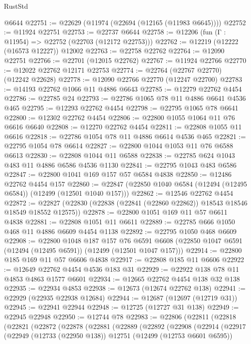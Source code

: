 \begin{lexlean}{RustStd}
\begin{coremodule}
    @6644
@22751 := @22629 (@11974 (@22694 (@12165 (@11983 @6645))))
@22752 := @11924 @22751
@22753 := @22737 @6644
@22758 := @12206 (fun (Γ : @11954) => @22752 (@22703 (@12172 @22753)))
@22762 := @12219 (@12222 (@16573 @12227)) @12002
@22763 := @22758 @22762
@22764 := @12090 @22751
@22766 := @22701 (@12015 @22762)
@22767 := @11924 @22766
@22770 := @12022 @22762 @12171 @22753
@22774 := @22764 (@22767 @22770) (@12242 @22628)
@22778 := @12090 @22766 @22770 (@12247 @22700)
@22783 := @14193 @22762 @1066 @11 @4886 @6643
@22785 := @12279 @22762 @4454
@22786 := @22785 @24
@22793 := @22786 @1065 @78 @11 @4886 @6641 @4536 @465
@22795 := @12293 @22762 @4454
@22798 := @22795 @1065 @78 @6641
@22800 := @12302 @22762 @4454
@22806 := @22800 @1055 @1064 @11 @76 @6616 @6640
@22808 := @12270 @22762 @4454
@22811 := @22808 @1055 @11 @6616
@22818 := @22786 @1054 @78 @11 @4886 @6614 @4536 @465
@22821 := @22795 @1054 @78 @6614
@22827 := @22800 @1044 @1053 @11 @76 @6588 @6613
@22830 := @22808 @1044 @11 @6588
@22838 := @22785 @624 @1043 @483 @11 @4886 @6586 @4536 @1130
@22841 := @22795 @1043 @483 @6586
@22847 := @22800 @1041 @169 @157 @57 @6584 @4838
@22850 := @12486 @22762 @4454 @157
@22860 := @22847 (@22850 @1040 @6584 (@12494 (@12495 @6584)) (@12499 (@12501 @1040 @157)))
@22862 := @12546 @22762 @4454
@22872 := @22827 (@22830 (@22838 (@22841 (@22860 @22862)) @18543 @18546 @18549 @18552 @12575))
@22878 := @22800 @1051 @169 @11 @57 @6611 @4838
@22881 := @22808 @1051 @11 @6611
@22889 := @22785 @666 @1050 @468 @11 @4886 @6609 @4454 @1138
@22892 := @22795 @1050 @468 @6609
@22908 := @22800
    @1048
    @187
    @157
    @76
    @6591
    @6608
    (@22850 @1047 @6591 (@12494 (@12495 @6591)) (@12499 (@12501 @1047 @157)))
@22914 := @22800 @185 @169 @11 @57 @6606 @4838
@22917 := @22808 @185 @11 @6606
@22922 := @12649 @22762 @4454 @4536 @183 @31
@22929 := @22922 @138 @78 @11 @4853 @4863 @1577 @6601
@22934 := @12665 @22762 @4454 @138 @32 @138
@22935 := @22934 @4853
@22938 := @12673 (@12674 @22762 @138)
@22941 := @22929 (@22935 @22938 @12684)
@22944 := @12687 (@12697 (@12719 @31))
@22945 := @22941 @22944
@22948 := @12725 (@12727 @31 @138)
@22949 := @22945 @22948
@22950 := @12744 @78
@22983 := @22806
    (@22811
      (@22818
        (@22821
          (@22872
            (@22878
              (@22881
                (@22889
                  (@22892
                    (@22908
                      (@22914
                        (@22917
                          (@22949
                            (@12733 (@22950 @138))
                            @12751
                            (@12499 (@12753 @6601 @6595))

\end{coremodule}
\end{lexlean}

